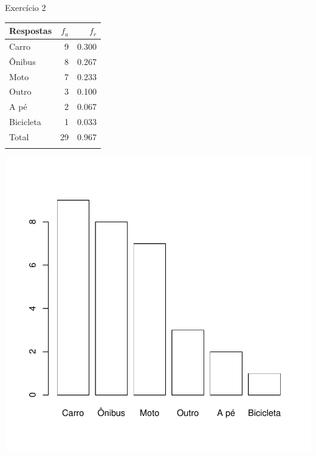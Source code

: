 \documentclass[
  ignorenonframetext,
  serif,
  professionalfont,
  usenames,
  dvipsnames,
  aspectratio = 169]{beamer}
\def\beginAHalfColumn{\begin{minipage}{0.49\textwidth}}%
\def\endColumns{\end{minipage}}%
\begin{document}
\begin{frame}{Exercício 2}
\label{exercuxedcio-2-2}
\beginAHalfColumn

\begin{longtable}[]{@{}lrr@{}}
\toprule\noalign{}
Respostas & \(f_a\) & \(f_r\) \\
\midrule\noalign{}
\endhead
Carro & 9 & 0.300 \\
Ônibus & 8 & 0.267 \\
Moto & 7 & 0.233 \\
Outro & 3 & 0.100 \\
A pé & 2 & 0.067 \\
Bicicleta & 1 & 0.033 \\
Total & 29 & 0.967 \\
\bottomrule\noalign{}
\end{longtable}

\endColumns
\beginAHalfColumn

\begin{center}\includegraphics[width=0.9\linewidth]{exercicios-encontro2-solucao_files/figure-beamer/unnamed-chunk-10-1} \end{center}

\endColumns
\end{frame}
\end{document}

